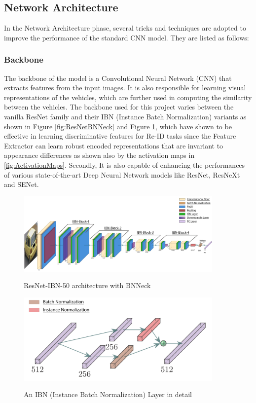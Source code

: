 \subsection{Network Architecture}
In the Network Architecture phase, several tricks and techniques are adopted to improve the performance of the standard CNN model. They are listed as follows:

\subsubsection{Backbone}
\label{subsubsec:Backbone}
The backbone of the model is a Convolutional Neural Network (CNN) that extracts features from the input images. It is also responsible for learning visual representations of the vehicles, which are further used in computing the similarity between the vehicles. The backbone used for this project varies between the vanilla ResNet family and their IBN (Instance Batch Normalization) variants \cite{IBN-Net} as shown in Figure \ref{fig:ResNetBNNeck} and Figure \ref{fig:IBNLayer}, which have shown to be effective in learning discriminative features for Re-ID tasks since the Feature Extractor can learn robust encoded representations that are invariant to appearance differences \cite{StrongBaselineForVehicleReID} as shown also by the activation maps in \ref{fig:ActivationMaps}. Secondly, It is also capable of enhancing the performances of various state-of-the-art Deep Neural Network models like ResNet, ResNeXt and SENet.

\begin{center}
    \begin{figure}[t]
        \includegraphics[width=0.90\textwidth]{images/ResNetFinalArchitecture.png}\hfill
        \caption[ResNet-IBN-50 Architecture with BNNeck]{ResNet-IBN-50 architecture with BNNeck}
        \label{fig:ResNetBNNeck}
        \includegraphics[width=0.90\textwidth]{images/IBNLayer.png}\\
        \caption[IBN (Instance Batch Normalization) Layer in detail]{An IBN (Instance Batch Normalization) Layer in detail}
        \label{fig:IBNLayer}
    \end{figure}
\end{center}

